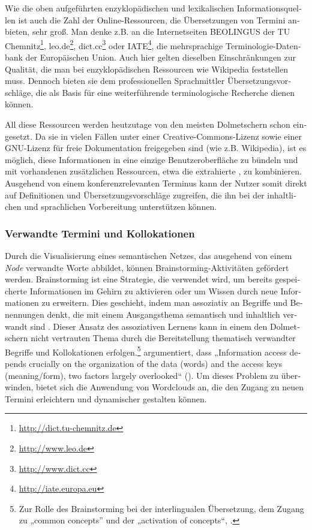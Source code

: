 \documentclass[output=paper]{LSP/langsci}
\begin{document}
\begin{otherlanguage}{ngerman}
Wie die oben aufgeführten enzyklopädischen und lexikalischen Informationsquellen ist auch die Zahl der Online-Ressourcen, die Übersetzungen von Termini anbieten, sehr groß. Man denke z.B. an die Internetseiten BEOLINGUS der TU Chemnitz\footnote{\url{http://dict.tu-chemnitz.de}}, leo.de\footnote{\url{http://www.leo.de}}, dict.cc\footnote{\url{http://www.dict.cc}} oder IATE\footnote{\url{http://iate.europa.eu}}, die mehrsprachige Termino\-lo\-gie-Da\-ten\-bank der Europäischen Union. Auch hier gelten dieselben Einschränkungen zur Qualität, die man bei enzyklopädischen Ressourcen wie Wikipedia feststellen muss. Dennoch bieten sie dem professionellen Sprachmittler Übersetzungsvorschläge, die als Basis für eine weiterführende terminologische Recherche dienen können. 

All diese Ressourcen werden heutzutage von den meisten Dolmetschern schon eingesetzt. Da sie in vielen Fällen unter einer Creative-Commons-Lizenz sowie einer GNU-Lizenz für freie Dokumentation freigegeben sind (wie z.B. Wikipedia), ist es möglich, diese Informationen in eine einzige Benutzeroberfläche zu bündeln und mit vorhandenen zusätzlichen Ressourcen, etwa die extrahierte , zu kombinieren. Ausgehend von einem konferenzrelevanten Terminus kann der Nutzer somit direkt auf Definitionen und Übersetzungsvorschläge zugreifen, die ihn bei der inhaltlichen und sprachlichen Vorbereitung unterstützen können.

\subsubsection{Verwandte Termini und Kollokationen}\label{sec:fantinuoli:6.1.5}

Durch die Visualisierung eines semantischen Netzes, das ausgehend von einem \textit{Node} verwandte Worte abbildet, können Brainstorming-Aktivitäten gefördert werden. Brainstorming ist eine Strategie, die verwendet wird, um bereits gespeicherte Informationen im Gehirn zu aktivieren oder um Wissen durch neue Informationen zu erweitern. Dies geschieht, indem man assoziativ an Begriffe und Benennungen denkt, die mit einem Ausgangsthema semantisch und inhaltlich verwandt sind \citep{Osborn1957}. Dieser Ansatz des assoziativen Lernens kann in einem den Dolmetschern nicht vertrauten Thema durch die Bereitstellung thematisch verwandter Begriffe und Kollokationen erfolgen.\footnote{Zur Rolle des Brainstorming bei der interlingualen Übersetzung, dem Zugang zu „common concepts” und der „activation of concepts“, \citet{Blot2003}.} \citeauthor{Zock2010} argumentiert, dass „Information access depends crucially on the organization of the data (words) and the access keys (meaning/form), two factors largely overlooked“ (\citeyear[201]{Zock2010}). Um dieses Problem zu überwinden, bietet sich die Anwendung von Wordclouds an, die den Zugang zu neuen Termini erleichtern und dynamischer gestalten können. 


\end{otherlanguage}
\end{document}
